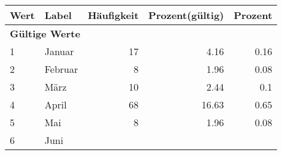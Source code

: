     \begin{longtable}{lXrrr}
     \toprule
     \textbf{Wert} & \textbf{Label} & \textbf{Häufigkeit} & \textbf{Prozent(gültig)} & \textbf{Prozent} \\
     \endhead
     \midrule
     \multicolumn{5}{l}{\textbf{Gültige Werte}}\\

     1 &
     \multicolumn{1}{X}{ Januar   } &


       \num{17} &
       \num[round-mode=places,round-precision=2]{4.16} &
         \num[round-mode=places,round-precision=2]{0.16} \\

     2 &
     \multicolumn{1}{X}{ Februar   } &


       \num{8} &
       \num[round-mode=places,round-precision=2]{1.96} &
         \num[round-mode=places,round-precision=2]{0.08} \\

     3 &
     \multicolumn{1}{X}{ März   } &


       \num{10} &
       \num[round-mode=places,round-precision=2]{2.44} &
         \num[round-mode=places,round-precision=2]{0.1} \\

     4 &
     \multicolumn{1}{X}{ April   } &


       \num{68} &
       \num[round-mode=places,round-precision=2]{16.63} &
         \num[round-mode=places,round-precision=2]{0.65} \\

     5 &
     \multicolumn{1}{X}{ Mai   } &


       \num{8} &
       \num[round-mode=places,round-precision=2]{1.96} &
         \num[round-mode=places,round-precision=2]{0.08} \\

     6 &
     \multicolumn{1}{X}{ Juni   } &



\end{longtable}
